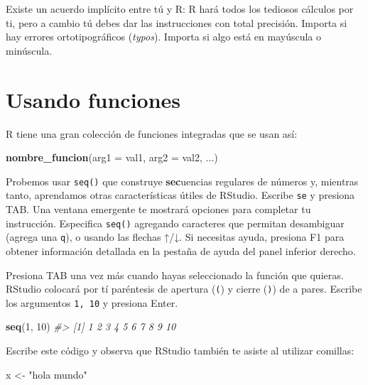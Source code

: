 \documentclass[11pt,oneside]{report}
\newenvironment{Shaded}{\begin{snugshade}}{\end{snugshade}}
\newcommand{\CommentTok}[1]{\textcolor[rgb]{0.56,0.35,0.01}{\textit{#1}}}
\newcommand{\DataTypeTok}[1]{\textcolor[rgb]{0.13,0.29,0.53}{#1}}
\newcommand{\DecValTok}[1]{\textcolor[rgb]{0.00,0.00,0.81}{#1}}
\newcommand{\KeywordTok}[1]{\textcolor[rgb]{0.13,0.29,0.53}{\textbf{#1}}}
\newcommand{\NormalTok}[1]{#1}
\newcommand{\StringTok}[1]{\textcolor[rgb]{0.31,0.60,0.02}{#1}}
\begin{document}
Existe un acuerdo implícito entre tú y R: R hará todos los tediosos
cálculos por ti, pero a cambio tú debes dar las instrucciones con total
precisión. Importa si hay errores ortotipográficos (\emph{typos}).
Importa si algo está en mayúscula o minúscula.

\hypertarget{usando-funciones}{%
\section{Usando funciones}\label{usando-funciones}}

R tiene una gran colección de funciones integradas que se usan así:

\begin{Shaded}
\begin{Highlighting}[]
\KeywordTok{nombre_funcion}\NormalTok{(}\DataTypeTok{arg1 =}\NormalTok{ val1, }\DataTypeTok{arg2 =}\NormalTok{ val2, ...)}
\end{Highlighting}
\end{Shaded}

Probemos usar \texttt{seq()} que construye \textbf{sec}uencias regulares
de números y, mientras tanto, aprendamos otras características útiles de
RStudio. Escribe \texttt{se} y presiona TAB. Una ventana emergente te
mostrará opciones para completar tu instrucción. Especifica
\texttt{seq()} agregando caracteres que permitan desambiguar (agrega una
\texttt{q}), o usando las flechas ↑/↓. Si necesitas ayuda, presiona F1
para obtener información detallada en la pestaña de ayuda del panel
inferior derecho.

Presiona TAB una vez más cuando hayas seleccionado la función que
quieras. RStudio colocará por tí paréntesis de apertura (\texttt{(}) y
cierre (\texttt{)}) de a pares. Escribe los argumentos \texttt{1,\ 10} y
presiona Enter.

\begin{Shaded}
\begin{Highlighting}[]
\KeywordTok{seq}\NormalTok{(}\DecValTok{1}\NormalTok{, }\DecValTok{10}\NormalTok{)}
\CommentTok{#>  [1]  1  2  3  4  5  6  7  8  9 10}
\end{Highlighting}
\end{Shaded}

Escribe este código y observa que RStudio también te asiste al utilizar
comillas:

\begin{Shaded}
\begin{Highlighting}[]
\NormalTok{x <-}\StringTok{ "hola mundo"}
\end{Highlighting}
\end{Shaded}
\end{document}
